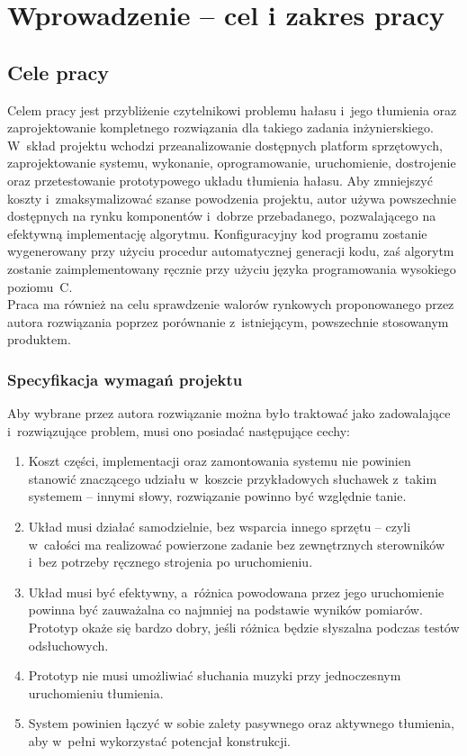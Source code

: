 \chapter{Wprowadzenie -- cel i zakres pracy}
\label{cha:intro}

\section{Cele pracy}
\label{sec:celePracy}
Celem pracy jest przybliżenie czytelnikowi problemu hałasu i~jego tłumienia oraz  zaprojektowanie kompletnego rozwiązania dla takiego zadania inżynierskiego. W~skład projektu wchodzi przeanalizowanie dostępnych platform sprzętowych, zaprojektowanie systemu, wykonanie, oprogramowanie, uruchomienie, dostrojenie oraz przetestowanie prototypowego układu tłumienia hałasu. Aby zmniejszyć koszty i~zmaksymalizować szanse powodzenia projektu, autor używa powszechnie dostępnych na rynku komponentów i~dobrze przebadanego, pozwalającego na efektywną implementację algorytmu. Konfiguracyjny kod programu zostanie wygenerowany przy użyciu procedur automatycznej generacji kodu, zaś algorytm zostanie zaimplementowany ręcznie przy użyciu języka programowania wysokiego poziomu~C.\\
Praca ma również na celu sprawdzenie walorów rynkowych proponowanego przez autora rozwiązania poprzez porównanie z~istniejącym, powszechnie stosowanym produktem.
\subsection{Specyfikacja wymagań projektu}
Aby wybrane przez autora rozwiązanie można było traktować jako zadowalające i~rozwiązujące problem, musi ono posiadać następujące cechy:
\begin{enumerate}
	\item Koszt części, implementacji oraz zamontowania systemu nie powinien stanowić znaczącego udziału w~koszcie przykładowych słuchawek z~takim systemem -- innymi słowy, rozwiązanie powinno być względnie tanie.
	\item Układ musi działać samodzielnie, bez wsparcia innego sprzętu -- czyli w~całości ma realizować powierzone zadanie bez zewnętrznych sterowników i~bez potrzeby ręcznego strojenia po uruchomieniu.
	\item Układ musi być efektywny, a~różnica powodowana przez jego uruchomienie powinna być zauważalna co najmniej na podstawie wyników pomiarów. Prototyp okaże się bardzo dobry, jeśli różnica będzie słyszalna podczas testów odsłuchowych.
	\item Prototyp nie musi umożliwiać słuchania muzyki przy jednoczesnym uruchomieniu tłumienia.
	\item System powinien łączyć w sobie zalety pasywnego oraz aktywnego tłumienia, aby w~pełni wykorzystać potencjał konstrukcji.
\end{enumerate}
